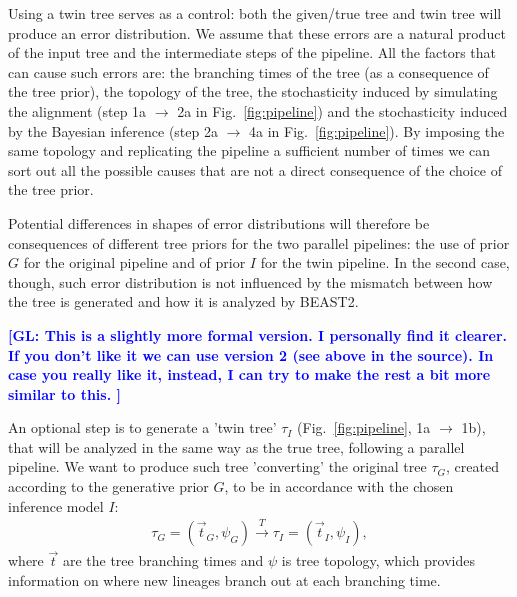\documentclass{article}
\newcommand{\giovanni}[1]{\textcolor{blue}{\textbf{[GL: #1]}}}
\begin{document}
Using a twin tree serves as a control: both the given/true tree and twin tree will produce an error distribution. We assume that these errors are a natural product of the input tree and the intermediate steps of the pipeline. All the factors that can cause such errors are: the branching times of the tree (as a consequence of the tree prior), the topology of the tree, the stochasticity induced by simulating the alignment (step 1a $\rightarrow$ 2a in Fig.~\ref{fig:pipeline}) and the stochasticity induced by the Bayesian inference (step 2a $\rightarrow$ 4a in Fig.~\ref{fig:pipeline}). By imposing the same topology and replicating the pipeline a sufficient number of times we can sort out all the possible causes that are not a direct consequence of the choice of the tree prior.

Potential differences in shapes of error distributions will therefore be consequences of different tree priors for the two parallel pipelines: the use of prior $\mathit{G}$ for the original pipeline and of prior $\mathit{I}$ for the twin pipeline. In the second case, though, such error distribution is not influenced by the mismatch between how the tree is generated and how it is analyzed by BEAST2.
\fi

\giovanni{
  This is a slightly more formal version. 
  I personally find it clearer. 
  If you don't like it we can use version 2 (see above in the source). 
  In case you really like it, instead, I can try to make the rest a bit more similar to this.
}

An optional step is to generate a 'twin tree' $\tau_{I}$
(Fig.~\ref{fig:pipeline}, 1a $\rightarrow$ 1b),
that will be analyzed in the same way as the true tree, following a parallel pipeline. We want to produce such tree 'converting' the original tree $\tau_{G}$, created according to the generative prior $\mathit{G}$, to be in accordance with the chosen inference model $\mathit{I}$:
\begin{align}
    \tau_{G} = (\Vec{t}_{G}, \psi_{G}) \xrightarrow[]{\mathit{T}} \tau_{I} = (\Vec{t}_{I}, \psi_{I}),
\end{align}
where $\Vec{t}$ are the tree branching times and $\psi$ is tree topology, which provides information on where new lineages branch out at each branching time.
\end{document}
